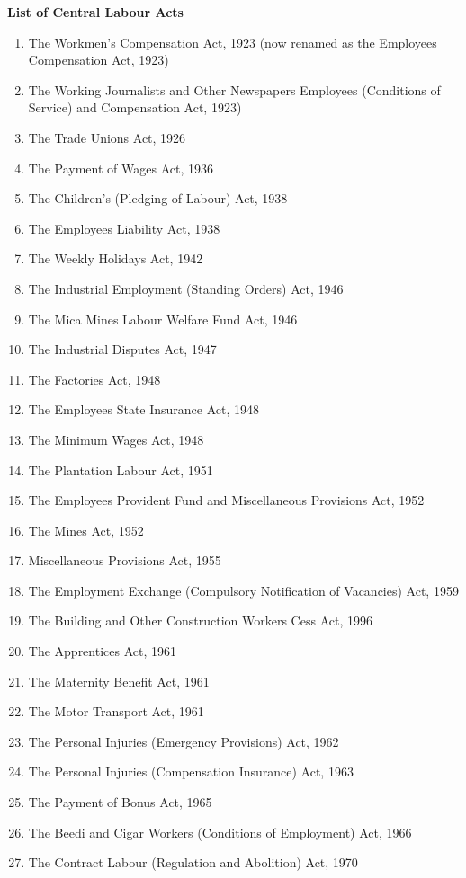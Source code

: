 \documentclass[a4paper, 12pt, twoside]{article}
\begin{document}
\textbf{List of Central Labour Acts}
\begin{enumerate}[noitemsep]
\item The Workmen's Compensation Act, 1923 (now renamed as the Employees Compensation Act, 1923)
\item The Working Journalists and Other Newspapers Employees (Conditions of Service) and Compensation Act, 1923)
\item The Trade Unions Act, 1926
\item The Payment of Wages Act, 1936
\item The Children's (Pledging of Labour) Act, 1938
\item The Employees Liability Act, 1938
\item The Weekly Holidays Act, 1942
\item The Industrial Employment (Standing Orders) Act, 1946
\item The Mica Mines Labour Welfare Fund Act, 1946
\item The Industrial Disputes Act, 1947
\item The Factories Act, 1948
\item The Employees State Insurance Act, 1948
\item The Minimum Wages Act, 1948
\item The Plantation Labour Act, 1951
\item The Employees Provident Fund and Miscellaneous Provisions Act, 1952
\item The Mines Act, 1952
\item Miscellaneous Provisions Act, 1955
\item The Employment Exchange (Compulsory Notification of Vacancies) Act, 1959
\item The Building and Other Construction Workers Cess Act, 1996 
\item The Apprentices Act, 1961
\item The Maternity Benefit Act, 1961
\item The Motor Transport Act, 1961
\item The Personal Injuries (Emergency Provisions) Act, 1962
\item The Personal Injuries (Compensation Insurance) Act, 1963
\item The Payment of Bonus Act, 1965
\item The Beedi and Cigar Workers (Conditions of Employment) Act, 1966
\item The Contract Labour (Regulation and Abolition) Act, 1970

\end{enumerate}
\end{document}
